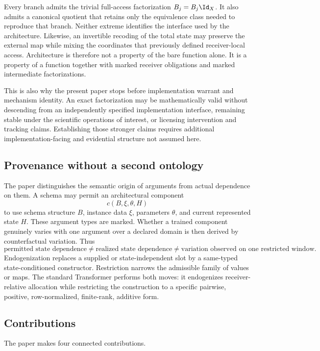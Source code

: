 Every branch admits the trivial full-access factorization $B_j=B_j\Id_X$. It also admits a canonical quotient that retains only the equivalence class needed to reproduce that branch. Neither extreme identifies the interface used by the architecture. Likewise, an invertible recoding of the total state may preserve the external map while mixing the coordinates that previously defined receiver-local access. Architecture is therefore not a property of the bare function alone. It is a property of a function together with marked receiver obligations and marked intermediate factorizations.

This is also why the present paper stops before implementation warrant and mechanism identity. An exact factorization may be mathematically valid without descending from an independently specified implementation interface, remaining stable under the scientific operations of interest, or licensing intervention and tracking claims. Establishing those stronger claims requires additional implementation-facing and evidential structure not assumed here.

\subsection{Provenance without a second ontology}

The paper distinguishes the semantic origin of arguments from actual dependence on them. A schema may permit an architectural component
\[
c(B,\xi,\theta,H)
\]
to use schema structure $B$, instance data $\xi$, parameters $\theta$, and current represented state $H$. These argument types are marked. Whether a trained component genuinely varies with one argument over a declared domain is then derived by counterfactual variation. Thus
\[
\text{permitted state dependence}
\neq
\text{realized state dependence}
\neq
\text{variation observed on one restricted window}.
\]
Endogenization replaces a supplied or state-independent slot by a same-typed state-conditioned constructor. Restriction narrows the admissible family of values or maps. The standard Transformer performs both moves: it endogenizes receiver-relative allocation while restricting the construction to a specific pairwise, positive, row-normalized, finite-rank, additive form.

\subsection{Contributions}

The paper makes four connected contributions.

